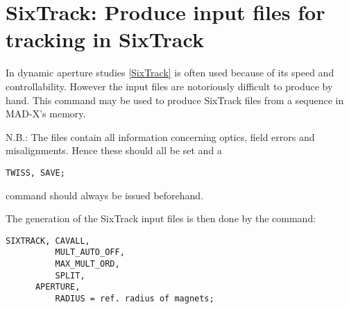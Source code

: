 
\chapter{SixTrack: Produce input files for tracking in SixTrack}
\label{chap:sixtrack}

In dynamic aperture studies
\href{../Introduction/bibliography.html#SixTrack}{[SixTrack]} is often
used because of its  speed and controllability. However the input files
are notoriously difficult  to produce by hand. This command may be used
to produce SixTrack files from  a sequence in MAD-X's memory.  
 
 N.B.: The files contain all information concerning optics, field errors
 and misalignments. Hence these should all be set and a   
\begin{verbatim}
TWISS, SAVE;
\end{verbatim} 
command should always be issued beforehand.

 The generation of the SixTrack input files is then done by the command: 
\begin{verbatim}
SIXTRACK, CAVALL,
          MULT_AUTO_OFF,
          MAX_MULT_ORD,
          SPLIT,
	  APERTURE,
          RADIUS = ref. radius of magnets;
\end{verbatim} 

